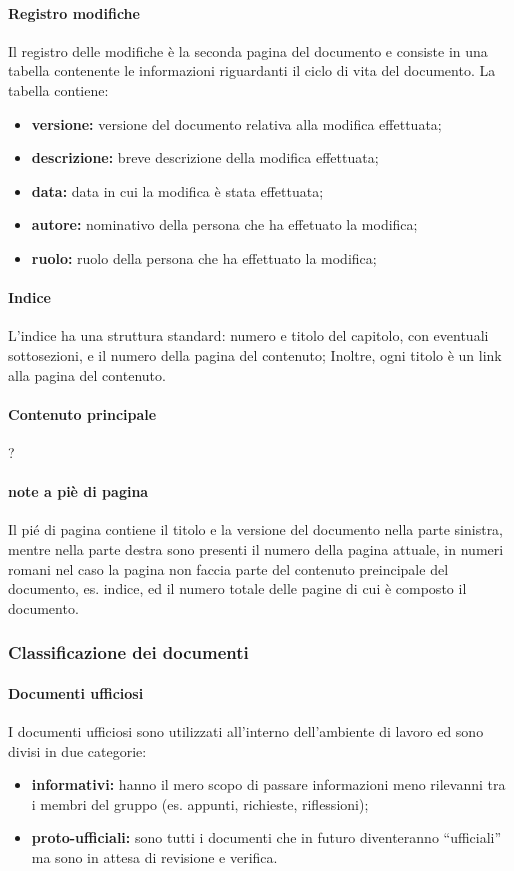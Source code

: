			\paragraph{Registro modifiche}
				Il registro delle modifiche è la seconda pagina del documento e consiste in una tabella contenente le informazioni riguardanti il ciclo di vita del documento. La tabella contiene:
				\begin{itemize}
					\item \textbf{versione:} versione del documento relativa alla modifica effettuata;
					\item \textbf{descrizione:} breve descrizione della modifica effettuata;
					\item \textbf{data:} data in cui la modifica è stata effettuata;
					\item \textbf{autore:} nominativo della persona che ha effetuato la modifica;
					\item \textbf{ruolo:} ruolo della persona che ha effettuato la modifica;
				\end{itemize}
			\paragraph{Indice}
				L'indice ha una struttura standard: numero e titolo del capitolo, con eventuali sottosezioni, e il numero della pagina del contenuto; Inoltre, ogni titolo è un link alla pagina del contenuto.
			\paragraph{Contenuto principale}
				?
			\paragraph{note a piè di pagina}
				Il pié di pagina contiene il titolo e la versione del documento nella parte sinistra, mentre nella parte destra sono presenti il numero della pagina attuale, in numeri romani nel caso la pagina non faccia parte del contenuto preincipale del documento, es. indice, ed il numero totale delle pagine di cui è composto il documento.

		\subsubsection{Classificazione dei documenti}
			\paragraph{Documenti ufficiosi}
				I documenti ufficiosi sono utilizzati all'interno dell'ambiente di lavoro ed sono divisi in due categorie:
				\begin{itemize}
					\item \textbf{informativi:} hanno il mero scopo di passare informazioni meno rilevanni tra i membri del gruppo (es. appunti, richieste, riflessioni);
					\item \textbf{proto-ufficiali:} sono tutti i documenti che in futuro diventeranno ``ufficiali'' ma sono in attesa di revisione e verifica.
				\end{itemize}
